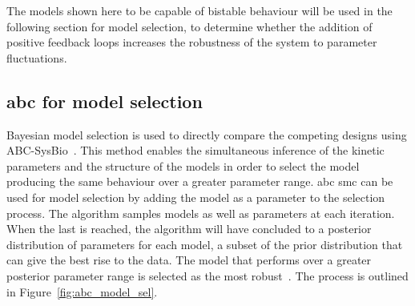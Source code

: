 The models shown here to be capable of bistable behaviour will be used in the following section for model selection, to determine whether the addition of positive feedback loops increases the robustness of the system to parameter fluctuations.



\subsection{\acrshort{abc} for model selection}

Bayesian model selection is used to directly compare the competing designs using ABC-SysBio~\autocite{Liepe:2010eg}. This method enables the simultaneous inference of the kinetic parameters and the structure of the models in order to select the model producing the same behaviour over a greater parameter range. \acrshort{abc} \acrshort{smc} can be used for model selection by adding the model as a parameter to the selection process. The algorithm samples models as well as parameters at each iteration. When the last \textepsilon{} is reached, the algorithm will have concluded to a posterior distribution of parameters for each model, a subset of the prior distribution that can give the best rise to the data. The model that performs over a greater posterior parameter range is selected as the most robust~\autocite{Toni:2009tr}. The process is outlined in Figure~\ref{fig:abc_model_sel}.
    
